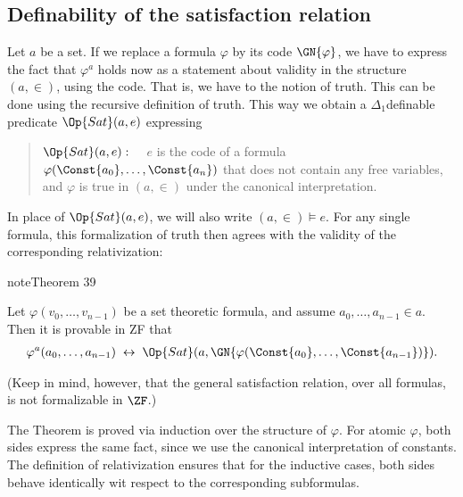 \documentclass[letterpaper,10pt,english]{jupyterBook}
\begin{document}
\subsection{Definability of the satisfaction relation}
\label{\detokenize{constructible:definability-of-the-satisfaction-relation}}
\sphinxAtStartPar
Let \(a\) be a set. If we replace a formula \(\varphi\) by its code \(\GN{\varphi}\), we have to express the fact that \(\varphi^a\) holds now as a statement about validity in the structure \((a,\in)\), using the code. That is, we have to  the notion of truth. This can be done using the recursive definition of truth.
This way we obtain a \(\Delta_1\)\sphinxhyphen{}definable predicate \(\Op{Sat}(a,e)\) expressing
\begin{quote}

\sphinxAtStartPar
\(\Op{Sat}(a,e): \quad\) \(e\) is the code of a formula \(\varphi(\Const{a_0}, \dots, \Const{a_n})\) that does not contain any free variables, and \(\varphi\) is true in \((a,\in)\) under the canonical interpretation.
\end{quote}

\sphinxAtStartPar
In place of  \(\Op{Sat}(a,e)\), we will also write \((a,\in) \models e\). For any single formula, this formalization of truth then agrees with the validity of the corresponding relativization:
\label{constructible:thm-sat-predicate}
\begin{sphinxadmonition}{note}{Theorem 39}



\sphinxAtStartPar
Let \(\varphi(v_0, \dots, v_{n-1})\) be a set theoretic formula, and assume \(a_0, \dots, a_{n-1} \in a\). Then it is provable in ZF that
\begin{equation*}
\begin{split}
	\varphi^a(a_0, \dots, a_{n-1}) \; \leftrightarrow \; \Op{Sat}(a,\GN{\varphi(\Const{a_0}, \dots, \Const{a_{n-1}})}).
\end{split}
\end{equation*}\end{sphinxadmonition}

\sphinxAtStartPar
(Keep in mind, however, that the general satisfaction relation, over all formulas, is not formalizable in \(\ZF\).)

\sphinxAtStartPar
The Theorem is proved via induction over the structure of \(\varphi\). For atomic \(\varphi\), both sides express the same fact, since we use the canonical interpretation of constants. The definition of relativization ensures that for the inductive cases, both sides behave identically wit respect to the corresponding subformulas.
\end{document}
